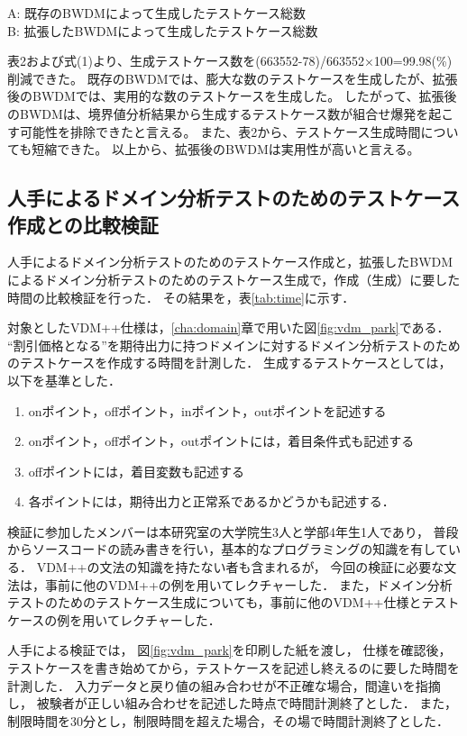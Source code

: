 \documentclass[uplatex, report, a4j, 10pt]{jsbook}
\begin{document}
\begin{center}
  A: 既存のBWDMによって生成したテストケース総数\\
  B: 拡張したBWDMによって生成したテストケース総数\\
\end{center}

表2および式(1)より、生成テストケース数を(663552-78)/663552×100=99.98(\%)削減できた。
既存のBWDMでは、膨大な数のテストケースを生成したが、拡張後のBWDMでは、実用的な数のテストケースを生成した。
したがって、拡張後のBWDMは、境界値分析結果から生成するテストケース数が組合せ爆発を起こす可能性を排除できたと言える。
また、表2から、テストケース生成時間についても短縮できた。
以上から、拡張後のBWDMは実用性が高いと言える。

\subsection{人手によるドメイン分析テストのためのテストケース作成との比較検証}

人手によるドメイン分析テストのためのテストケース作成と，拡張したBWDMによるドメイン分析テストのためのテストケース生成で，作成（生成）に要した時間の比較検証を行った．
その結果を，表\ref{tab:time}に示す．

対象としたVDM++仕様は，\ref{cha:domain}章で用いた図\ref{fig:vdm_park}である．
“割引価格となる”を期待出力に持つドメインに対するドメイン分析テストのためのテストケースを作成する時間を計測した．
生成するテストケースとしては，以下を基準とした．
\begin{enumerate}
  \item onポイント，offポイント，inポイント，outポイントを記述する
  \item onポイント，offポイント，outポイントには，着目条件式も記述する
  \item offポイントには，着目変数も記述する
  \item 各ポイントには，期待出力と正常系であるかどうかも記述する．
\end{enumerate}

検証に参加したメンバーは本研究室の大学院生3人と学部4年生1人であり，
普段からソースコードの読み書きを行い，基本的なプログラミングの知識を有している．
VDM++の文法の知識を持たない者も含まれるが，
今回の検証に必要な文法は，事前に他のVDM++の例を用いてレクチャーした．
また，ドメイン分析テストのためのテストケース生成についても，事前に他のVDM++仕様とテストケースの例を用いてレクチャーした．

人手による検証では，
図\ref{fig:vdm_park}を印刷した紙を渡し，
仕様を確認後，
テストケースを書き始めてから，テストケースを記述し終えるのに要した時間を計測した．
入力データと戻り値の組み合わせが不正確な場合，間違いを指摘し，
被験者が正しい組み合わせを記述した時点で時間計測終了とした．
また，制限時間を30分とし，制限時間を超えた場合，その場で時間計測終了とした．
\end{document}
